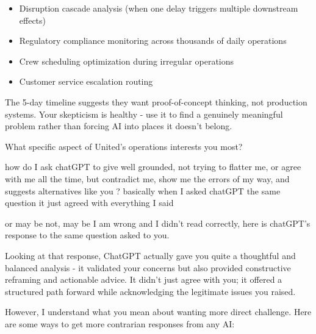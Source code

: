
\begin{itemize}
\item Disruption cascade analysis (when one delay triggers multiple downstream effects)
\end{itemize}
\begin{itemize}
\item Regulatory compliance monitoring across thousands of daily operations
\end{itemize}
\begin{itemize}
\item Crew scheduling optimization during irregular operations
\end{itemize}
\begin{itemize}
\item Customer service escalation routing
\end{itemize}

The 5-day timeline suggests they want proof-of-concept thinking, not production systems. Your skepticism is healthy - use it to find a genuinely meaningful problem rather than forcing AI into places it doesn't belong.

What specific aspect of United's operations interests you most?


how do I ask chatGPT to give well grounded, not trying to flatter me, or agree with me all the time, but contradict me, show me the errors of my way, and suggests alternatives like you ? basically when I asked chatGPT the same question it just agreed with everything I said

or may be not, may be I am wrong and I didn't read correctly, here is chatGPT's response to the same question asked to you.


Looking at that response, ChatGPT actually gave you quite a thoughtful and balanced analysis - it validated your concerns but also provided constructive reframing and actionable advice. It didn't just agree with you; it offered a structured path forward while acknowledging the legitimate issues you raised.

However, I understand what you mean about wanting more direct challenge. Here are some ways to get more contrarian responses from any AI:


